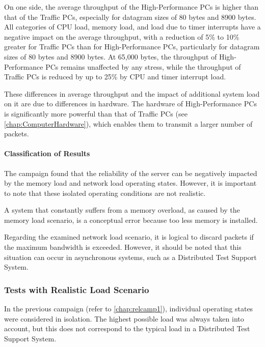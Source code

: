 On one side, the average throughput of the High-Performance PCs is higher than that of the Traffic PCs, especially for datagram sizes of 80 bytes and 8900 bytes. All categories of \ac{CPU} load, memory load, and load due to timer interrupts have a negative impact on the average throughput, with a reduction of 5\% to 10\% greater for Traffic PCs than for High-Performance PCs, particularly for datagram sizes of 80 bytes and 8900 bytes.  At 65,000 bytes, the throughput of High-Performance PCs remains unaffected by any stress, while the throughput of Traffic PCs is reduced by up to 25\% by \ac{CPU} and timer interrupt load.

These differences in average throughput and the impact of additional system load on it are due to differences in hardware. The hardware of High-Performance PCs is significantly more powerful than that of Traffic PCs (see \ref{chap:ComputerHardware}), which enables them to transmit a larger number of packets.

\paragraph{Classification of Results}
The campaign found that the reliability of the server can be negatively impacted by the memory load and network load operating states. However, it is important to note that these isolated operating conditions are not realistic.

A system that constantly suffers from a memory overload, as caused by the memory load scenario, is a conceptual error because too less memory is installed.

Regarding the examined network load scenario, it is logical to discard packets if the maximum bandwidth is exceeded. However, it should be noted that this situation can occur in asynchronous systems, such as a Distributed Test Support System.

\subsubsection{Tests with Realistic Load Scenario} \label{chap:campaignloadscen}
In the previous campaign (refer to \ref{chap:relcamp1}), individual operating states were considered in isolation. The highest possible load was always taken into account, but this does not correspond to the typical load in a Distributed Test Support System.

